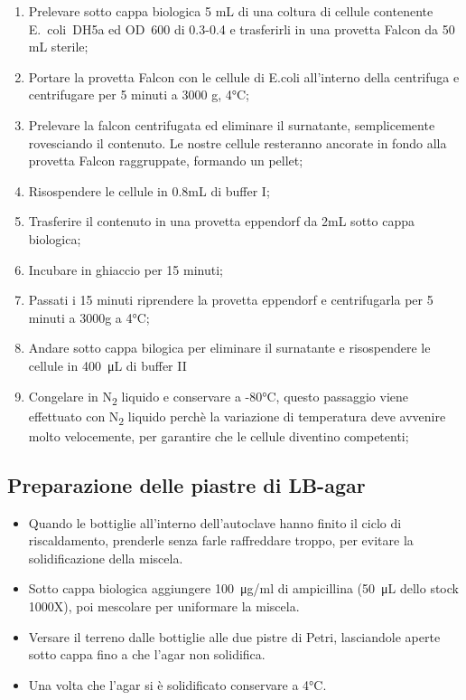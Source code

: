 \begin{enumerate}

	\item Prelevare sotto cappa biologica 5 mL di una coltura di cellule
  contenente E.~coli~DH5a ed OD~600 di 0.3-0.4 e trasferirli in
  una provetta Falcon da 50 mL sterile;

  \item Portare la provetta Falcon con le cellule di E.coli all'interno della centrifuga
  e centrifugare per 5 minuti a 3000 g, 4°C;

  \item Prelevare la falcon centrifugata ed eliminare il surnatante, semplicemente
  rovesciando il contenuto. Le nostre cellule resteranno ancorate in fondo alla provetta
  Falcon raggruppate, formando un pellet;

  \item Risospendere le cellule in 0.8mL di buffer I;

  \item Trasferire il contenuto in una provetta eppendorf da 2mL sotto cappa biologica;

  \item Incubare in ghiaccio per 15 minuti;

  \item Passati i 15 minuti riprendere la provetta eppendorf e centrifugarla per 5 minuti a 3000g a 4°C;

  \item Andare sotto cappa bilogica per eliminare il surnatante e risospendere
  le cellule in \SI{400}{\micro\liter} di buffer II

  \item Congelare in N\textsubscript2 liquido e conservare a -80°C,
  questo passaggio viene effettuato con N\textsubscript2 liquido perchè
  la variazione di temperatura deve avvenire molto velocemente, per garantire
  che le cellule diventino competenti;

\end{enumerate}

\subsection{Preparazione delle piastre di LB-agar}

\begin{itemize}
  \item Quando le bottiglie all'interno dell'autoclave hanno finito il ciclo di riscaldamento,
  prenderle senza farle raffreddare troppo, per evitare la solidificazione della miscela.
  \item Sotto cappa biologica aggiungere \SI{100}{\micro\gram}/ml di ampicillina
  (\SI{50}{\micro\liter} dello stock 1000X), poi mescolare per uniformare la miscela.
  \item Versare il terreno dalle bottiglie alle due pistre di Petri,
  lasciandole aperte sotto cappa fino a che l'agar non solidifica.
  \item Una volta che l'agar si è solidificato conservare a 4°C.
\end{itemize}



